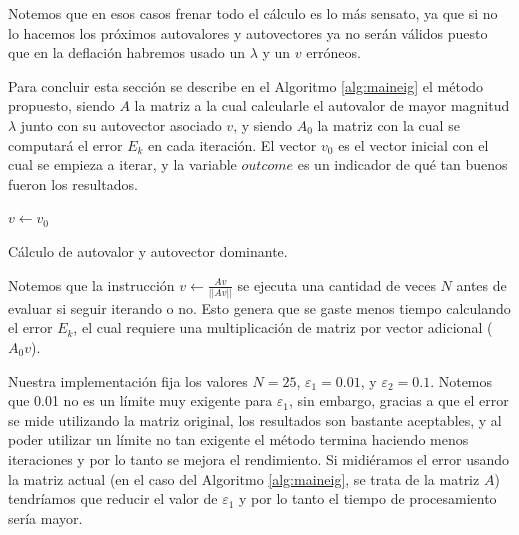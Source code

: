 \documentclass[a4paper]{article}
\begin{document}
Notemos que en esos casos frenar todo el cálculo es lo más sensato, ya que si no lo hacemos los próximos autovalores y autovectores ya no serán 
válidos puesto que en la deflación habremos usado un $\lambda$ y un $v$ erróneos.

Para concluir esta sección se describe en el Algoritmo \ref{alg:maineig} el método propuesto, siendo $A$ la matriz a la cual calcularle el autovalor de mayor magnitud 
$\lambda$ junto con su autovector asociado $v$, y siendo $A_0$ la matriz con la cual se computará el error $E_k$ en cada iteración. El vector $v_0$ 
es el vector inicial con el cual se empieza a iterar, y la variable $outcome$ es un indicador de qué tan buenos fueron los resultados.

\vspace{\baselineskip}
\begin{algorithm}[H]
    $v \gets v_0$\;
    \caption{Cálculo de autovalor y autovector dominante.}
    \label{alg:maineig}
\end{algorithm}
\vspace{\baselineskip}

Notemos que la instrucción $v \gets \frac{Av}{||Av||}$ se ejecuta una cantidad de veces $N$ antes de evaluar si seguir iterando o no. Esto genera 
que se gaste menos tiempo calculando el error $E_k$, el cual requiere una multiplicación de matriz por vector adicional ($A_0 v$).

Nuestra implementación fija los valores $N = 25$, $\varepsilon_1 = 0.01$, y $\varepsilon_2 = 0.1$. Notemos que 0.01 no es un límite muy exigente 
para $\varepsilon_1$, sin embargo, gracias a que el error se mide utilizando la matriz original, los resultados son bastante aceptables, y al poder 
utilizar un límite no tan exigente el método termina haciendo menos iteraciones y por lo tanto se mejora el rendimiento. Si midiéramos el error 
usando la matriz actual (en el caso del Algoritmo \ref{alg:maineig}, se trata de la matriz $A$) tendríamos que reducir el valor de $\varepsilon_1$ 
y por lo tanto el tiempo de procesamiento sería mayor.
\end{document}
